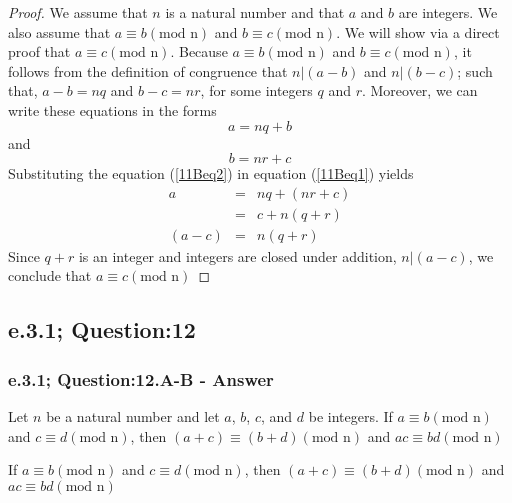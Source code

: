 \begin{proof}

We assume that $n$ is a natural number and that $a$ and $b$ are integers. We also assume that $a \equiv b (\text{mod n})$ and $b \equiv c (\text{mod n})$. We will show via a direct proof that $a \equiv c (\text{mod n})$. Because $a \equiv b (\text{mod n})$ and $b \equiv c (\text{mod n})$, it follows from the definition of congruence that $n|(a-b)$ and $n|(b-c)$; such that, $a-b = nq$ and $b-c = nr$, for some integers $q$ and $r$. Moreover, we can write these equations in the forms 
	\begin{equation}
	\label{11Beq1}	
		a = nq + b
	\end{equation}
and 
	\begin{equation}
	\label{11Beq2}
		b = nr + c
	\end{equation}
Substituting the equation (\ref{11Beq2}) in equation (\ref{11Beq1}) yields
	\begin{eqnarray}
		a & = & nq + (nr + c) \nonumber \\
		& = & c + n(q+r) \nonumber \\
		(a-c)& = & n(q+r) \nonumber
	\end{eqnarray}
Since $q+r$ is an integer and integers are closed under addition, $n | (a-c)$, we conclude that $a \equiv c (\text{mod n})$

\end{proof}




\newpage
\subsection{e.3.1; Question:12}
\subsubsection*{e.3.1; Question:12.A-B - Answer}
Let $n$ be a natural number and let $a$, $b$, $c$, and $d$ be integers. If $a \equiv b (\text{mod n})$ and $c \equiv d (\text{mod n})$, then $(a + c) \equiv (b + d) (\text{mod n})$ and $ac \equiv bd (\text{mod n})$ \\

\begin{tcolorbox}
	\begin{theorem}
		If $a \equiv b (\text{mod n})$ and $c \equiv d (\text{mod n})$, then $(a + c) \equiv (b + d) (\text{mod n})$ and $ac \equiv bd (\text{mod n})$
	\end{theorem}
\end{tcolorbox}

